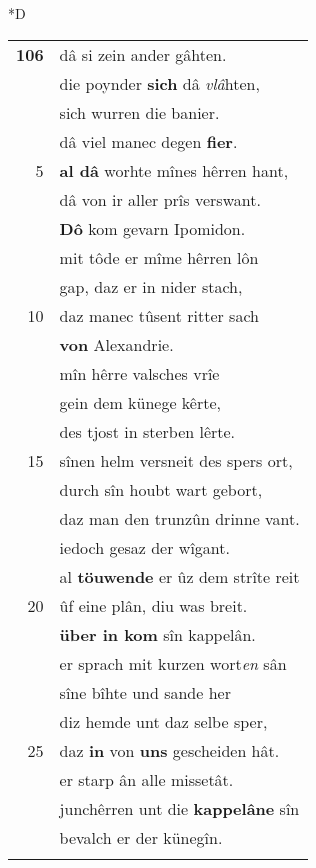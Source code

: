 \documentclass[8pt,a4paper,notitlepage]{article}
\begin{document}
\begin{table}[ht]
\begin{minipage}[t]{0.5\linewidth}
\small
\begin{center}*D
\end{center}
\begin{tabular}{rl}
\textbf{106} & dâ si zein ander gâhten.\\ 
 & die poynder \textbf{sich} dâ \textit{vlâ}hten,\\ 
 & sich wurren die banier.\\ 
 & dâ viel manec degen \textbf{fier}.\\ 
5 & \textbf{al dâ} worhte mînes hêrren hant,\\ 
 & dâ von ir aller prîs verswant.\\ 
 & \textbf{Dô} kom gevarn Ipomidon.\\ 
 & mit tôde er mîme hêrren lôn\\ 
 & gap, daz er in nider stach,\\ 
10 & daz manec tûsent ritter sach\\ 
 & \textbf{von} Alexandrie.\\ 
 & mîn hêrre valsches vrîe\\ 
 & gein dem künege kêrte,\\ 
 & des tjost in sterben lêrte.\\ 
15 & sînen helm versneit des spers ort,\\ 
 & durch sîn houbt wart gebort,\\ 
 & daz man den trunzûn drinne vant.\\ 
 & iedoch gesaz der wîgant.\\ 
 & al \textbf{töuwende} er ûz dem strîte reit\\ 
20 & ûf eine plân, diu was breit.\\ 
 & \textbf{über in kom} sîn kappelân.\\ 
 & er sprach mit kurzen wort\textit{en} sân\\ 
 & sîne bîhte und sande her\\ 
 & diz hemde unt daz selbe sper,\\ 
25 & daz \textbf{in} von \textbf{uns} gescheiden hât.\\ 
 & er starp ân alle missetât.\\ 
 & junchêrren unt die \textbf{kappelâne} sîn\\ 
 & bevalch er der künegîn.\\ 
 & \textit{\begin{large}E\end{large}}r wart geleit ze Baldac.\\ 

\end{tabular}
\end{minipage}
\end{table}
\end{document}
